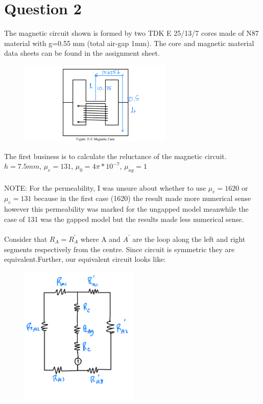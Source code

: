 \documentclass{article}
\begin{document}
\section{Question 2}
The magnetic circuit shown is formed by two TDK E 25/13/7 cores made of N87 material with g=0.55 mm (total air-gap 1mm). The core and magnetic material data sheets can be found in the assignment sheet.\\
\begin{figure}[H]
    \centering
    \includegraphics[width=0.65\textwidth]{q2.png}
    \label{Q2-img}
\end{figure}
The first business is to calculate the reluctance of the magnetic circuit.
\\$ h = 7.5mm$,  $\mu_e = 131$, $\mu_0 = 4\pi*10^{-7}$, $\mu_{ag} = 1$ \\
\\NOTE: For the permeability, I was unsure about whether to use $\mu_e = 1620$ or $\mu_e = 131$ because in the first case (1620) the result made more numerical sense however this permeability was marked for the ungapped model meanwhile the case of 131 was the gapped model but the results made less numerical sense.\\
\\Consider that $R_A = R_{A}^{'}$ where A and $A^'$ are the loop along the left and right segments respectively from the centre. Since circuit is symmetric they are equivalent.Further, our equivalent circuit looks like:
\begin{figure}[H]
    \centering
    \includegraphics[width=0.5\textwidth]{Q2-eq-circ.png}
    \label{q2 - eq circuit}
\end{figure}
\end{document}
